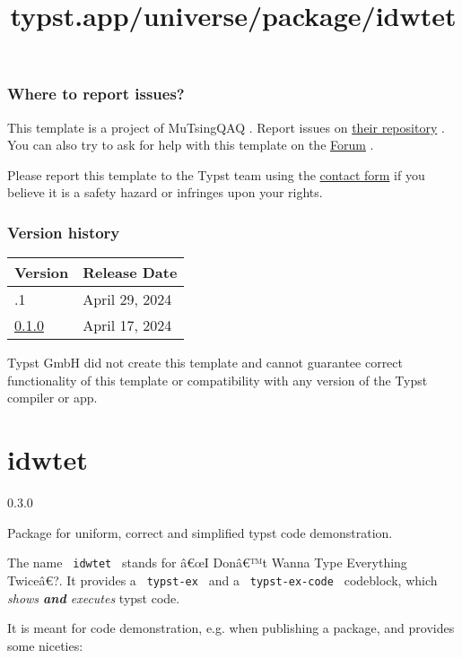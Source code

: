 \subsubsection{Where to report issues?}\label{where-to-report-issues}

This template is a project of MuTsingQAQ . Report issues on
\href{https://github.com/Duolei-Wang/sustech-thesis-typst}{their
repository} . You can also try to ask for help with this template on the
\href{https://forum.typst.app}{Forum} .

Please report this template to the Typst team using the
\href{https://typst.app/contact}{contact form} if you believe it is a
safety hazard or infringes upon your rights.

\label{versions}
\subsubsection{Version history}\label{version-history}

\begin{longtable}[]{@{}ll@{}}
\toprule\noalign{}
Version & Release Date \\
\midrule\noalign{}
\endhead
\bottomrule\noalign{}
\endlastfoot
0.1.1 & April 29, 2024 \\
\href{https://typst.app/universe/package/modern-sustech-thesis/0.1.0/}{0.1.0}
& April 17, 2024 \\
\end{longtable}

Typst GmbH did not create this template and cannot guarantee correct
functionality of this template or compatibility with any version of the
Typst compiler or app.


\title{typst.app/universe/package/idwtet}

\label{banner}
\section{idwtet}\label{idwtet}

{ 0.3.0 }

Package for uniform, correct and simplified typst code demonstration.

\label{readme}
The name \texttt{\ idwtet\ } stands for â€œI Donâ€™t Wanna Type
Everything Twiceâ€?. It provides a \texttt{\ typst-ex\ } and a
\texttt{\ typst-ex-code\ } codeblock, which \emph{shows \textbf{and}
executes} typst code.

It is meant for code demonstration, e.g. when publishing a package, and
provides some niceties:

